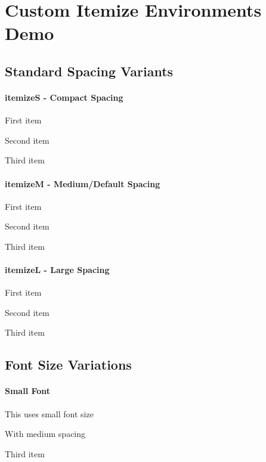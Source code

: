 \documentclass{article}
\begin{document}
\section{Custom Itemize Environments Demo}

\subsection{Standard Spacing Variants}

\paragraph{itemizeS - Compact Spacing}
\begin{itemizeS}
  \item First item
  \item Second item
  \item Third item
\end{itemizeS}

\paragraph{itemizeM - Medium/Default Spacing}
\begin{itemizeM}
  \item First item
  \item Second item
  \item Third item
\end{itemizeM}

\paragraph{itemizeL - Large Spacing}
\begin{itemizeL}
  \item First item
  \item Second item
  \item Third item
\end{itemizeL}

\subsection{Font Size Variations}

\paragraph{Small Font}
\begin{itemizeM}[small]
  \item This uses small font size
  \item With medium spacing
  \item Third item
\end{itemizeM}
\end{document}
